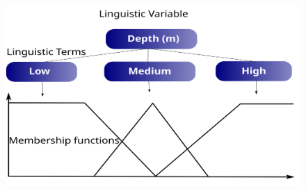 \documentclass[aspectratio=169]{beamer} %
\begin{document}
{{{{

{ \begin{frame}
	\vspace{1cm}
	\begin{center}
	\begin{large}
	\color{blue}{Fuzzy system}
	\end{large}
	\end{center}
\begin{flushright}
    \begin{columns}

        \centering
         \begin{figure}
		\centering
		\includegraphics[scale=0.4]{images/fuzzy_logic.png}
	\end{figure}



\end{columns}
\end{flushright}
\end{frame}}}}}}
\end{document}
